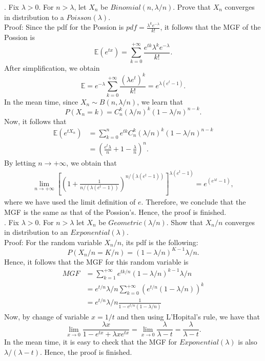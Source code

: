 \documentclass[11pt]{article} \pagestyle{plain}
\def\beq{\begin{equation}}
\def\eeq{\end{equation}}
\def \ld    {\lambda}
\begin{document}
. Fix $\lambda>0$. For $n>\lambda$, let $X_{n}$ be $Binomial(n, \ld/n)$. Prove that $X_{n}$ converges in distribution to a $Poisson(\ld)$.\\

\noindent Proof: Since the pdf for the Possion is $pdf = \frac{\ld^{k}e^{-\ld}}{k!}$, it follows that the MGF of the Possion is \beq \mathbb{E}(e^{tx}) = \sum_{k=0}^{+\infty}\frac{e^{tk}\ld^{k}e^{-\ld}}{k!}.\eeq
After simplification, we obtain \beq \mathbb{E} = e^{-\ld}\sum_{k=0}^{+\infty}\frac{(\ld e^{t})^{k}}{k!} = e^{\ld (e^{t}-1)}.\eeq
In the mean time, since $X_{n}\sim B(n,\ld/n)$, we learn that \beq P(X_{n} = k) = C_{n}^{k}(\ld/n)^{k}(1-\ld/n)^{n-k}.\eeq Now, it follows that \begin{align*} \mathbb{E}(e^{tX_{n}}) & = \sum_{k=0}^{n}e^{tk}C_{n}^{k}(\ld/n)^{k}(1-\ld/n)^{n-k}\\ & = \left(\frac{e^{t}\ld}{n}+1-\frac{\ld}{n}\right)^{n}.\end{align*} 
By letting $n\to +\infty$, we obtain that 
\begin{align*}\lim_{n\to +\infty}\left[\left(1+\frac{1}{n/(\ld(e^{t}-1))}\right)^{n/(\ld(e^{t}-1))}\right]^{\ld(e^{t}-1)} = e^{(e^{\ld t}-1)},\end{align*} where we have used the limit definition of $e$. Therefore, we conclude that the MGF is the same as that of the Possion's. Hence, the proof is finished.\\


. Fix $\ld>0$. For $n>\ld$ let $X_{n}$ be $Geometric(\ld/n)$. Show that $X_{n}/n$ converges in distribution to an $Exponential(\ld)$. \\

\noindent Proof: For the random variable $X_{n}/n$, its pdf is the following:
\beq P(X_{n}/n = K/n) = (1-\ld/n)^{K-1}\ld/n.\eeq
Hence, it follows that the MGF for this random variable is 
\begin{align*} MGF & = \sum_{k=1}^{+\infty}e^{tk/n}(1-\ld/n)^{k-1}\ld/n
	\\ & = e^{t/n}\ld/n \sum_{k=0}^{+\infty}(e^{t/n}(1-\ld/n))^{k}
	\\ & = e^{t/n}\ld/n \frac{1}{1-e^{t/n}(1-\ld/n)}\end{align*}
Now, by change of variable $x = 1/t$ and then using L'Hopital's rule, we have that 
\beq \lim_{x \to 0}\frac{\ld x}{1-e^{tx}+\ld x e^{tx}} = \lim_{x \to 0}\frac{\ld}{\ld -t} = \frac{\ld}{\ld-t}.\eeq
In the mean time, it is easy to check that the MGF for $Exponential(\ld)$ is also $\ld/(\ld -t)$. Hence, the proof is finished.\\
\end{document}
